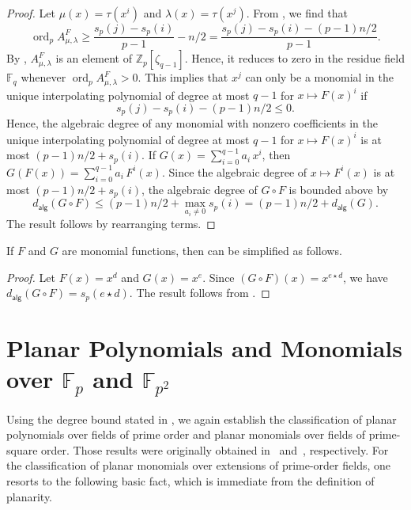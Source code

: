 \documentclass[12pt]{article}
\newcommand{\F}{\mathbb{F}}
\newcommand{\ZZ}{\mathbb{Z}}
\newcommand{\wt}{s_p}
\DeclareMathOperator{\ord}{ord}
\newcommand{\adeg}[1]{d_{\mathsf{alg}}(#1)}
\begin{document}
\degreeBoundPlanar*
\begin{proof}
Let $\mu(x) = \tau(x^i)$ and $\lambda(x) = \tau(x^j)$. From , we find that
\begin{equation*}
\ord_p A^F_{\mu, \lambda} \ge \frac{\wt(j) - \wt(i)}{p - 1} - n/2 = \frac{\wt(j) - \wt(i)- (p - 1)n/2}{p - 1}.
\end{equation*}
By , $A^F_{\mu, \lambda}$ is an element of $\ZZ_p[\zeta_{q - 1}]$. Hence, it reduces to zero in the residue field $\F_q$ whenever $\ord_p A^F_{\mu, \lambda} > 0$. This implies that $x^j$ can only be a monomial in the unique interpolating polynomial of degree at most $q - 1$ for $x \mapsto F(x)^i$ if
\begin{equation*}
\wt(j) - \wt(i) - (p - 1) n/2 \le 0.
\end{equation*}
Hence, the algebraic degree of any monomial with nonzero coefficients in the unique interpolating polynomial of degree at most $q - 1$ for $x \mapsto F(x)^i$ is at most $(p - 1) n / 2 + \wt(i)$. If $G(x) = \sum_{i = 0}^{q - 1} a_i\,x^i$, then $G(F(x)) = \sum_{i = 0}^{q - 1} a_i\,F^i(x)$. Since the algebraic degree of $x \mapsto F^i(x)$ is at most $(p - 1)n/2 + \wt(i)$, the algebraic degree of $G \circ F$ is bounded above by 
\begin{equation*}
\adeg{G\circ F} \le (p - 1) n/2 + \max_{a_i \neq 0} \wt(i) = (p - 1) n/2 + \adeg{G}.
\end{equation*}
The result follows by rearranging terms.
\end{proof}

If $F$ and $G$ are monomial functions, then  can be simplified as follows.
\degreeBoundPlanarMonomial*
\begin{proof}
Let $F(x) = x^d$ and $G(x) = x^e$. Since $(G \circ F)(x) = x^{e \star d}$, we have $\adeg{G \circ F} = \wt(e \star d)$.
The result follows from .
\end{proof}

\section{Planar Polynomials and Monomials over \texorpdfstring{$\F_{p}$}{Fields of Prime Order} and \texorpdfstring{$\F_{p^2}$}{Finite Fields of Degree 2}}
\label{sec:classification_prime}
Using the degree bound stated in , we again establish the classification of planar polynomials over fields of prime order and planar monomials over fields of  prime-square order. Those results were originally obtained in~\cite{DBLP:journals/dm/Gluck90,hiramine1989conjecture,ronyai1989planar} and~\cite{coulter2006classification}, respectively. For the classification of planar monomials over extensions of prime-order fields, one resorts to the following basic fact, which is immediate from the definition of planarity.
\end{document}
